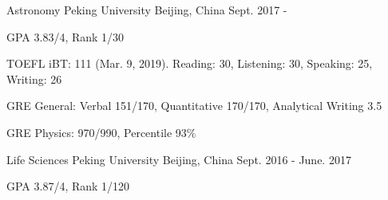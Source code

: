 


\begin{cventries}


\cventry
{Astronomy} %
{Peking University} %
{Beijing, China} %
{Sept. 2017 - } %
{ %
	\begin{cvitems}
		\item {GPA 3.83/4, Rank 1/30}
		\item {TOEFL iBT: 111 (Mar. 9, 2019). Reading: 30, Listening: 30, Speaking: 25, Writing: 26}
		\item {	GRE General: Verbal 151/170, Quantitative 170/170, Analytical Writing 3.5}
		\item {	GRE Physics: 970/990, Percentile 93\%}
	\end{cvitems}
}

\cventry
{Life Sciences} %
{Peking University} %
{Beijing, China} %
{Sept. 2016 - June. 2017} %
{ %
	\begin{cvitems}
		\item {GPA 3.87/4, Rank 1/120}
	\end{cvitems}
}


\end{cventries}